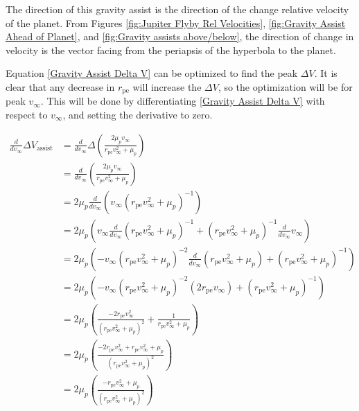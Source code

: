 \documentclass[../main.tex]{subfiles}
\begin{document}
The direction of this gravity assist is the direction of the change relative velocity of the planet. From Figures \ref{fig:Jupiter Flyby Rel Velocities}, \ref{fig:Gravity Assist Ahead of Planet}, and \ref{fig:Gravity assists above/below}, the direction of change in velocity is the vector facing from the periapsis of the hyperbola to the planet.

Equation \eqref{Gravity Assist Delta V} can be optimized to find the peak $\Delta V$. It is clear that any decrease in $r_\text{pe}$ will increase the $\Delta V$, so the optimization will be for peak $v_\infty$. This will be done by differentiating \eqref{Gravity Assist Delta V} with respect to $v_\infty$, and setting the derivative to zero.

\begin{align*}
    \frac{d}{dv_\infty}\Delta V_\text{assist} & =\frac{d}{dv_\infty}\Delta\left(\frac{2\mu_p v_\infty}{r_\text{pe}v_\infty^2+\mu_p}\right)                                                         \\
                                              & =\frac{d}{dv_\infty}\left(\frac{2\mu_p v_\infty}{r_\text{pe}v_\infty^2+\mu_p}\right)                                                               \\
                                              & =2\mu_p\frac{d}{dv_\infty}\left(v_\infty(r_\text{pe}v_\infty^2+\mu_p)^{-1}\right)                                                                  \\
                                              & =2\mu_p\left(v_\infty\frac{d}{dv_\infty}(r_\text{pe}v_\infty^2+\mu_p)^{-1}+(r_\text{pe}v_\infty^2+\mu_p)^{-1}\frac{d}{dv_\infty}v_\infty\right)    \\
                                              & =2\mu_p\left(-v_\infty(r_\text{pe}v_\infty^2+\mu_p)^{-2}\frac{d}{dv_\infty}(r_\text{pe}v_\infty^2+\mu_p)+(r_\text{pe}v_\infty^2+\mu_p)^{-1}\right) \\
                                              & =2\mu_p\left(-v_\infty(r_\text{pe}v_\infty^2+\mu_p)^{-2}(2r_\text{pe}v_\infty)+(r_\text{pe}v_\infty^2+\mu_p)^{-1}\right)                           \\
                                              & =2\mu_p\left(\frac{-2r_\text{pe}v_\infty^2}{(r_\text{pe}v_\infty^2+\mu_p)^2}+\frac{1}{r_\text{pe}v_\infty^2+\mu_p}\right)                          \\
                                              & =2\mu_p\left(\frac{-2r_\text{pe}v_\infty^2+r_\text{pe}v_\infty^2+\mu_p}{(r_\text{pe}v_\infty^2+\mu_p)^2}\right)                                    \\
                                              & =2\mu_p\left(\frac{-r_\text{pe}v_\infty^2+\mu_p}{(r_\text{pe}v_\infty^2+\mu_p)^2}\right)                                                           \\
\end{align*}
\end{document}
